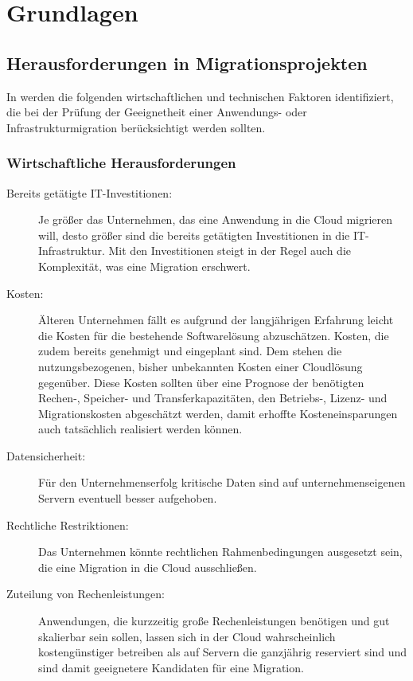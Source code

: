 \section{Grundlagen}


\subsection{Herausforderungen in Migrationsprojekten}
In   werden die folgenden wirtschaftlichen und 
technischen Faktoren identifiziert, die bei der Prüfung der Geeignetheit einer 
Anwendungs- oder Infrastrukturmigration berücksichtigt werden sollten.

\subsubsection{Wirtschaftliche Herausforderungen}
\begin{description}
	\item[Bereits getätigte IT-Investitionen:]
	Je größer das Unternehmen, das eine Anwendung in die Cloud migrieren 
will, desto größer sind die bereits getätigten Investitionen in die 
IT-Infrastruktur. Mit den Investitionen steigt in der Regel auch die 
Komplexität, was eine Migration erschwert.
	\item[Kosten:] Älteren Unternehmen fällt es aufgrund der langjährigen 
Erfahrung leicht die Kosten für die bestehende Softwarelösung abzuschätzen. 
Kosten, die zudem bereits genehmigt und eingeplant sind. Dem stehen die 
nutzungsbezogenen, bisher unbekannten Kosten einer Cloudlösung gegenüber. Diese 
Kosten sollten über eine Prognose der benötigten Rechen-, Speicher- und 
Transferkapazitäten, den Betriebs-, Lizenz- und Migrationskosten abgeschätzt 
werden, damit erhoffte Kosteneinsparungen auch tatsächlich realisiert werden 
können.
	\item[Datensicherheit:] Für den Unternehmenserfolg kritische Daten sind 
auf unternehmenseigenen Servern eventuell besser aufgehoben.
	\item[Rechtliche Restriktionen:] Das Unternehmen könnte rechtlichen 
Rahmenbedingungen ausgesetzt sein, die eine Migration in die Cloud ausschließen.
	\item[Zuteilung von Rechenleistungen:] Anwendungen, die kurzzeitig 
große Rechenleistungen benötigen und gut skalierbar sein sollen, lassen sich in 
der Cloud wahrscheinlich kostengünstiger betreiben als auf Servern die 
ganzjährig reserviert sind und sind damit geeignetere Kandidaten für eine 
Migration.
\end{description}

